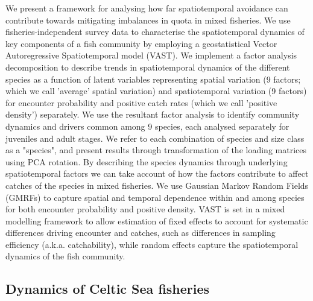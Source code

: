 \documentclass[fleqn,10pt]{wlscirep}
\begin{document}
\begin{linenumbers}
We present a framework for analysing how far spatiotemporal avoidance can
contribute towards mitigating imbalances in quota in mixed fisheries. We use
fisheries-independent survey data to characterise the spatiotemporal dynamics
of key components of a fish community by employing a geostatistical Vector
Autoregressive Spatiotemporal model (VAST). We implement a factor analysis
decomposition to describe trends in spatiotemporal dynamics of the different
species as a function of latent variables\cite{Thorson2015} representing
spatial variation (9 factors; which we call 'average' spatial variation) and
spatiotemporal variation (9 factors) for encounter probability and positive
catch rates (which we call 'positive density') separately\cite{Thorson2015a}.
We use the resultant factor analysis to identify community dynamics and drivers
common among 9 species, each analysed separately for juveniles and adult
stages.  We refer to each combination of species and size class as a
"species", and present results through transformation of
the loading matrices using PCA rotation.  By describing the species
dynamics through underlying  spatiotemporal
factors we can take account of how the factors contribute to affect catches of
the species in mixed fisheries.  We use Gaussian Markov Random Fields (GMRFs)
to capture spatial and temporal dependence within and among
species for both encounter probability and positive
density\cite{Thorson2013}. VAST is set in a mixed modelling framework to allow
estimation of fixed effects to account for systematic differences driving
encounter and catches, such as differences in sampling efficiency (a.k.a.
catchability), while random effects capture the spatiotemporal dynamics of the
fish community.\\

\subsection*{Dynamics of Celtic Sea fisheries\\}


\end{linenumbers}
\end{document}
